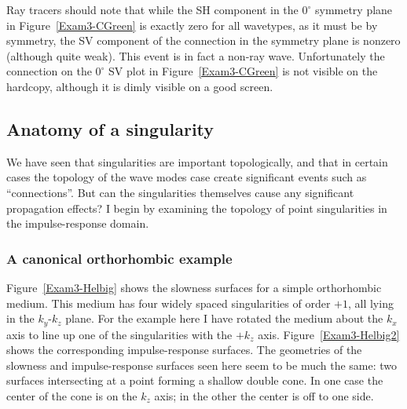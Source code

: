 Ray tracers should note that while
the SH component in the $0^\circ$ symmetry plane
in Figure~\ref{Exam3-CGreen} is exactly zero for all wavetypes,
as it must be by symmetry, the SV component of the connection
in the symmetry plane is nonzero (although quite weak).
This event is in fact a non-ray wave.
Unfortunately the connection on the $0^\circ$ SV plot
in Figure~\ref{Exam3-CGreen} is not visible on the hardcopy,
although it is dimly visible on a good screen.

\subsection{Anatomy of a singularity}
We have seen that singularities are important topologically,
and that in certain cases the topology of the wave modes
case create significant events such as ``connections''.
But can the singularities themselves cause
any significant propagation effects?
I begin by examining the topology of point singularities
in the impulse-response domain.

\subsubsection{A canonical orthorhombic example}
\label{Exam3-HelbigSec}
Figure~\ref{Exam3-Helbig} shows the {\qS} slowness surfaces
for a simple orthorhombic medium.
This medium has four widely spaced singularities of order $+1$,
all lying in the $k_y$-$k_z$ plane. For the example here I have rotated
the medium about the $k_x$ axis to line up one of the singularities
with the $+k_z$ axis.
Figure~\ref{Exam3-Helbig2} shows the corresponding impulse-response
surfaces.
The geometries of the slowness and impulse-response surfaces seen here
seem to be much the same:
two surfaces intersecting at a point forming a shallow double cone.
In one case the center of the cone is on the $k_z$ axis; in the other
the center is off to one side.


